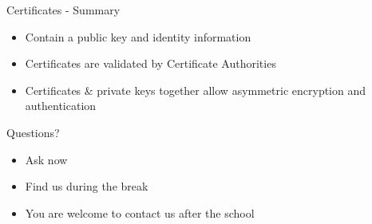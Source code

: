 \documentclass[aspectratio=169]{beamer}
\begin{document}
\begin{frame}{Certificates - Summary}
\begin{itemize}
\item Contain a public key and identity information
\item Certificates are validated by Certificate Authorities
\item Certificates \& private keys together allow asymmetric encryption and authentication
\end{itemize}
\end{frame}
\begin{frame}{Questions?}
\begin{itemize}
\item Ask now
\item Find us during the break
\item You are welcome to contact us after the school
\end{itemize}
\end{frame}
\end{document}
